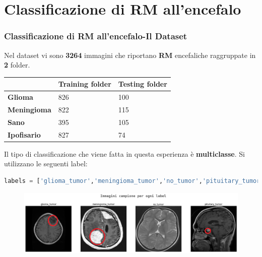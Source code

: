 \documentclass{beamer}
\begin{document}
\section{Classificazione di RM all'encefalo}


\begin{frame}
	\frametitle{Classificazione di RM all'encefalo-Il Dataset}
	Nel dataset vi sono \textbf{3264} immagini che 
	riportano \textbf{RM} encefaliche raggruppate 
	 in \textbf{2} folder.
	 \begin{table}[]
		\begin{tabular}{lll}
							& \textbf{Training folder} & \textbf{Testing folder} \\ \hline
		\textbf{Glioma}     & 826                      & 100                     \\
		\textbf{Meningioma} & 822                      & 115                     \\
		\textbf{Sano}       & 395                      & 105                     \\
		\textbf{Ipofisario} & 827                      & 74                     
		\end{tabular}
		\end{table}

\end{frame}

\begin{frame}[fragile]
Il tipo di classificazione che viene fatta in questa esperienza è \textbf{multiclasse}.
Si utilizzano le seguenti label:
\begin{lstlisting}[basicstyle=\tiny, language = Python, numbers = none]
	labels = ['glioma_tumor','meningioma_tumor','no_tumor','pituitary_tumor']
\end{lstlisting}
\begin{figure}
	\includegraphics[width=1\textwidth]{brain-samples.png}
\end{figure}

\end{frame}
\end{document}
